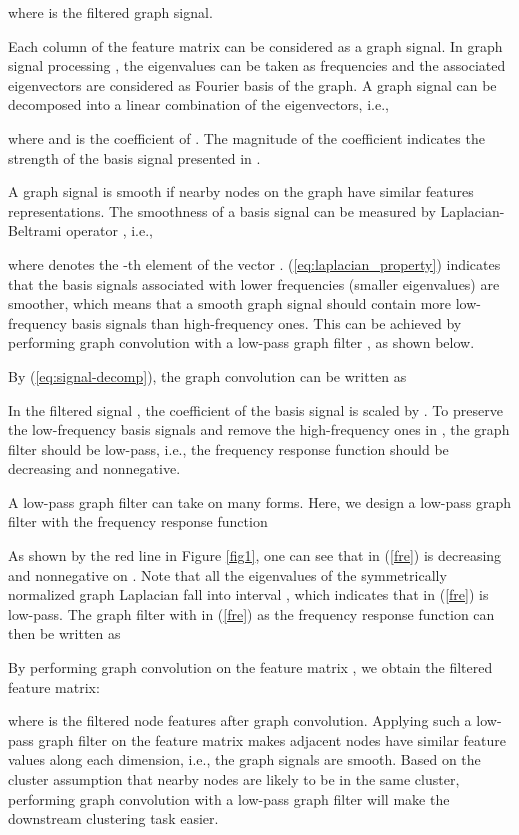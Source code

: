 \documentclass{article}
\begin{document}
where  is the filtered graph signal.



Each column of the feature matrix  can be considered as a graph signal. In graph signal processing \cite{shuman2013emerging}, the eigenvalues  can be taken as frequencies and the associated eigenvectors  are considered as Fourier basis of the graph. A graph signal  can be decomposed into a linear combination of the eigenvectors, i.e.,

where  and  is the coefficient of . The magnitude of the coefficient  indicates the strength of the basis signal  presented in .

A graph signal is smooth if nearby nodes on the graph have similar features representations. The smoothness of a basis signal  can be measured by Laplacian-Beltrami operator  \cite{Chung97}, i.e.,

where  denotes the -th element of the vector . (\ref{eq:laplacian_property}) indicates that the basis signals associated with lower frequencies (smaller eigenvalues) are smoother, which means that a smooth graph signal  should contain more low-frequency basis signals than high-frequency ones. This can be achieved by performing graph convolution with a low-pass graph filter , as shown below.

By (\ref{eq:signal-decomp}), the graph convolution can be written as

In the filtered signal , the coefficient  of the basis signal  is scaled by . To preserve the low-frequency basis signals and remove the high-frequency ones in , the graph filter  should be low-pass, i.e., the frequency response function  should be decreasing and nonnegative.



A low-pass graph filter can take on many forms. Here, we design a low-pass graph filter with the frequency response function

As shown by the red line in Figure \ref{fig1}, one can see that  in (\ref{fre}) is decreasing and nonnegative on . Note that all the eigenvalues  of the symmetrically normalized graph Laplacian  fall into interval  \cite{Chung97}, which indicates that  in (\ref{fre}) is low-pass. The graph filter  with  in (\ref{fre}) as the frequency response function can then be written as


By performing graph convolution on the feature matrix , we obtain the filtered feature matrix:

where  is the filtered node features after graph convolution. Applying such a low-pass graph filter on the feature matrix makes adjacent nodes have similar feature values along each dimension, i.e., the graph signals are smooth. Based on the cluster assumption that nearby nodes are likely to be in the same cluster, performing graph convolution with a low-pass graph filter will make the downstream clustering task easier.
\end{document}
